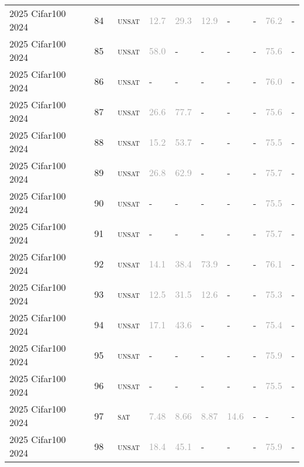 \begin{center}
{\begin{longtable}{@{}llllllllll@{}}
2025 Cifar100 2024 & 84 & ~\textsc{unsat} & \textcolor{darkgray}{12.7} & \textcolor{darkgray}{29.3} & \textcolor{darkgray}{12.9} & - & - & \textcolor{darkgray}{76.2} & - \\
2025 Cifar100 2024 & 85 & ~\textsc{unsat} & \textcolor{darkgray}{58.0} & - & - & - & - & \textcolor{darkgray}{75.6} & - \\
2025 Cifar100 2024 & 86 & ~\textsc{unsat} & - & - & - & - & - & \textcolor{darkgray}{76.0} & - \\
2025 Cifar100 2024 & 87 & ~\textsc{unsat} & \textcolor{darkgray}{26.6} & \textcolor{darkgray}{77.7} & - & - & - & \textcolor{darkgray}{75.6} & - \\
2025 Cifar100 2024 & 88 & ~\textsc{unsat} & \textcolor{darkgray}{15.2} & \textcolor{darkgray}{53.7} & - & - & - & \textcolor{darkgray}{75.5} & - \\
2025 Cifar100 2024 & 89 & ~\textsc{unsat} & \textcolor{darkgray}{26.8} & \textcolor{darkgray}{62.9} & - & - & - & \textcolor{darkgray}{75.7} & - \\
2025 Cifar100 2024 & 90 & ~\textsc{unsat} & - & - & - & - & - & \textcolor{darkgray}{75.5} & - \\
2025 Cifar100 2024 & 91 & ~\textsc{unsat} & - & - & - & - & - & \textcolor{darkgray}{75.7} & - \\
2025 Cifar100 2024 & 92 & ~\textsc{unsat} & \textcolor{darkgray}{14.1} & \textcolor{darkgray}{38.4} & \textcolor{darkgray}{73.9} & - & - & \textcolor{darkgray}{76.1} & - \\
2025 Cifar100 2024 & 93 & ~\textsc{unsat} & \textcolor{darkgray}{12.5} & \textcolor{darkgray}{31.5} & \textcolor{darkgray}{12.6} & - & - & \textcolor{darkgray}{75.3} & - \\
2025 Cifar100 2024 & 94 & ~\textsc{unsat} & \textcolor{darkgray}{17.1} & \textcolor{darkgray}{43.6} & - & - & - & \textcolor{darkgray}{75.4} & - \\
2025 Cifar100 2024 & 95 & ~\textsc{unsat} & - & - & - & - & - & \textcolor{darkgray}{75.9} & - \\
2025 Cifar100 2024 & 96 & ~\textsc{unsat} & - & - & - & - & - & \textcolor{darkgray}{75.5} & - \\
2025 Cifar100 2024 & 97 & ~\textsc{sat} & \textcolor{darkgray}{7.48} & \textcolor{darkgray}{8.66} & \textcolor{darkgray}{8.87} & \textcolor{darkgray}{14.6} & - & - & - \\
2025 Cifar100 2024 & 98 & ~\textsc{unsat} & \textcolor{darkgray}{18.4} & \textcolor{darkgray}{45.1} & - & - & - & \textcolor{darkgray}{75.9} & - \\

\end{longtable}}
\end{center}
